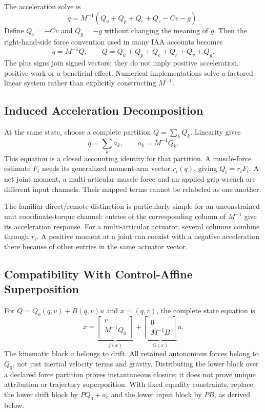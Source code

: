 The acceleration solve is
\begin{equation}
\ddot q=M^{-1}(Q_u+Q_p+Q_e+Q_r-Cv-g).
\label{eq:ch3b:forward}
\end{equation}
Define $Q_v=-Cv$ and $Q_g=-g$ without changing the meaning of $g$. Then the right-hand-side force convention used in many IAA accounts becomes
\begin{equation}
\ddot q=M^{-1}Q,\qquad
Q=Q_u+Q_p+Q_e+Q_r+Q_v+Q_g.
\label{eq:ch3b:biomech_convention}
\end{equation}
The plus signs join signed vectors; they do not imply positive acceleration, positive work or a beneficial effect. Numerical implementations solve a factored linear system rather than explicitly constructing $M^{-1}$.

\subsection{Induced Acceleration Decomposition}

At the same state, choose a complete partition $Q=\sum_k Q_k$. Linearity gives
\begin{equation}
\ddot q=\sum_k a_k,\qquad a_k=M^{-1}Q_k.
\label{eq:ch3b:iaa_decomp}
\end{equation}
This equation is a closed accounting identity for that partition. A muscle-force estimate $F_i$ needs its generalized moment-arm vector $r_i(q)$, giving $Q_i=r_iF_i$. A net joint moment, a multi-articular muscle force and an applied grip wrench are different input channels. Their mapped terms cannot be relabeled as one another.

The familiar direct/remote distinction is particularly simple for an unconstrained unit coordinate-torque channel: entries of the corresponding column of $M^{-1}$ give its acceleration response. For a multi-articular actuator, several columns combine through $r_i$. A positive moment at a joint can coexist with a negative acceleration there because of other entries in the same actuator vector.

\subsection{Compatibility With Control-Affine Superposition}
\label{thm:iaa_equivalence}

For $Q=Q_0(q,v)+B(q,v)u$ and $x=(q,v)$, the complete state equation is
\[
\dot x=
\underbrace{\begin{bmatrix}v\\M^{-1}Q_0\end{bmatrix}}_{f(x)}
+\underbrace{\begin{bmatrix}0\\M^{-1}B\end{bmatrix}}_{G(x)}u.
\]
The kinematic block $v$ belongs to drift. All retained autonomous forces belong to $Q_0$, not just inertial velocity terms and gravity. Distributing the lower block over a declared force partition proves instantaneous closure; it does not prove unique attribution or trajectory superposition. With fixed equality constraints, replace the lower drift block by $PQ_0+a_c$ and the lower input block by $PB$, as derived below.

